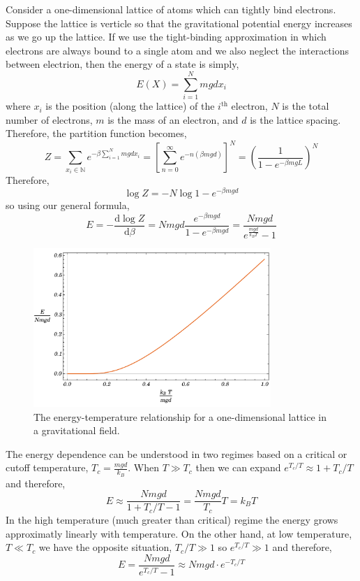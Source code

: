 \documentclass[11pt,a4paper]{article}
\renewcommand{\d}[1]{\mathrm{d}#1}
\newcommand{\deriv}[2]{\frac{\d{#1}}{\d{#2}}}
\newcommand{\N}{\mathbb{N}}
\renewcommand{\th}[1]{$#1^\mathrm{th}$}
\theoremstyle{theorem}
\theoremstyle{definition}
\theoremstyle{definition}
\theoremstyle{remark}
\theoremstyle{definition}
\theoremstyle{remark}
\begin{document}
Consider a one-dimensional lattice of atoms which can tightly bind electrons. Suppose the lattice is verticle so that the gravitational potential energy increases as we go up the lattice. If we use the tight-binding approximation in which electrons are always bound to a single atom and we also neglect the interactions between electrion, then the energy of a state is simply,
\[ E(X) = \sum_{i = 1}^N mgd x_i \]
where $x_i$ is the position (along the lattice) of the \th{i} electron, $N$ is the total number of electrons, $m$ is the mass of an electron, and $d$ is the lattice spacing. Therefore, the partition function becomes,
\[ Z = \sum_{x_i \in \N} e^{-\beta \sum\limits_{i = 1}^N mgd x_i} = \left[ \sum_{n = 0}^\infty e^{-n(\beta mg d)} \right]^N = \left(\frac{1}{1 - e^{-\beta m g L}} \right)^N \]
Therefore, 
\[\log{Z} = - N \log{1 - e^{-\beta mg d}} \]
so using our general formula,
\[ E = - \deriv{\log{Z}}{\beta} = N mgd \frac{e^{-\beta m g d}}{1 - e^{-\beta m g d}} = \frac{N mg d}{e^{\frac{mgd}{k_B T}} - 1} \]
\begin{figure}
\begin{center}
\includegraphics[width = 9cm, height = 6cm]{GravLatticeEnergy}
\caption{The energy-temperature relationship for a one-dimensional lattice in a gravitational field.}
\label{energygravlattice}
\end{center}
\end{figure}
The energy dependence can be understood in two regimes based on a critical or cutoff temperature, $T_c = \frac{mgd}{k_B}$. When $T \gg T_c$ then we can expand $e^{T_c/T} \approx 1 + T_c/T$ and therefore,
\[ E \approx \frac{N mg d}{1 + T_c/T - 1} =  \frac{N mgd}{T_c} T = k_B T \]
In the high temperature (much greater than critical) regime the energy grows approximatly linearly with temperature. On the other hand, at low temperature, $T \ll T_c$ we have the opposite situation, $T_c/T \gg 1$ so $e^{T_c/T} \gg 1$ and therefore,
\[ E = \frac{N mg d}{e^{T_c/T} - 1} \approx N mgd \cdot e^{-T_c/T} \]
\end{document}
